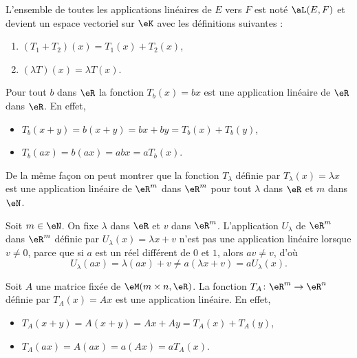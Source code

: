 \begin{lemmaDef} \label{DefDQRooVGbzSm}
	L'ensemble de toutes les applications linéaires de \( E\) vers \( F\) est noté \( \aL(E,F)\) et devient un espace vectoriel sur \( \eK\) avec les définitions suivantes :
	\begin{enumerate}
		\item
		      \( (T_1+T_2)(x)=T_1(x)+T_2(x)\),
		\item
		      \( (\lambda T)(x)=\lambda T(x)\).
	\end{enumerate}
\end{lemmaDef}

\begin{example}     \label{EXooMAWMooEaNWpl}
	Pour tout \( b\) dans \( \eR\) la fonction \( T_b(x)= bx\) est une application linéaire de \( \eR\) dans \( \eR\). En effet,
	\begin{itemize}
		\item  \( T_b(x+y)= b(x+y)= bx + by = T_b(x)+T_b(y)\),
		\item \( T_b(ax)=b(ax)= abx = a T_b(x)\).
	\end{itemize}
	De la même façon on peut montrer que la fonction \( T_{\lambda}\) définie par \( T_{\lambda}(x)=\lambda x\) est une application linéaire de \( \eR^m\) dans \( \eR^m\) pour tout \( \lambda\) dans \( \eR\) et \( m\) dans \( \eN\).
\end{example}

\begin{example}     \label{ex_affine}
	Soit \( m\in\eN\). On fixe \( \lambda\) dans \( \eR\) et \( v\) dans \( \eR^m\). L'application \( U_{\lambda}\) de \( \eR^m\) dans \( \eR^m\) définie par \( U_{\lambda}(x)=\lambda x+v\) n'est pas une application linéaire lorsque \( v \neq 0 \), parce que si \( a \) est un réel différent de \(0 \) et \( 1 \), alors \( av \neq v \), d'où
	\[
		U_{\lambda}(ax)=\lambda(ax)+v\neq a(\lambda x+v) =a U_{\lambda}(x).
	\]
\end{example}

\begin{example}     \label{exampleT_A}
	Soit \( A\) une matrice fixée de \( \eM(m\times n, \eR)\). La fonction \( T_A\colon \eR^m\to \eR^n\) définie par \( T_A(x)=Ax\) est une application linéaire. En effet,
	\begin{itemize}
		\item \( T_A(x+y) = A(x+y)= Ax + Ay = T_A(x)+T_A(y)\),
		\item \( T_A(ax)  = A(ax) = a(Ax)   = a T_A(x)\).
	\end{itemize}
\end{example}

